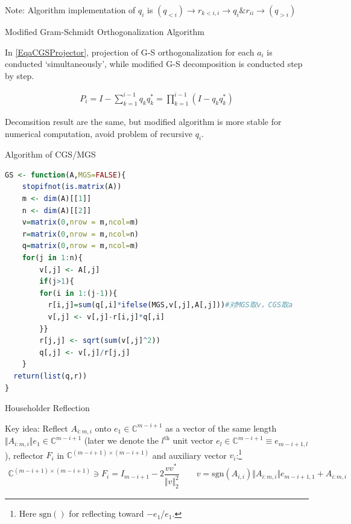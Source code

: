     Note: Algorithm implementation of $ q_i $ is $ (q_{<i})\to r_{k<i,i}\to q_{i}\& r_{ii} \to (q_{>i}) $


\begin{point}
    Modified Gram-Schmidt Orthogonalization Algorithm
\end{point}

    In \autoref{EqaCGSProjector}, projection of G-S orthogonalization for each $ a_i $ is conducted `simultaneously', while modified G-S decomposition is conducted step by step.

\begin{align}
    P_i=I-\sum_{k=1}^{i-1}q_kq_k^*=\prod_{k=1}^{i-1}(I-q_kq_k^*) 
\end{align}
    
    Decomsition result are the same, but modified algorithm is more stable for numerical computation, avoid problem of recursive $ q_i $.


\begin{rcode}
    Algorithm of CGS/MGS
\begin{lstlisting}[language=R]
GS <- function(A,MGS=FALSE){
    stopifnot(is.matrix(A))
    m <- dim(A)[[1]]
    n <- dim(A)[[2]]
    v=matrix(0,nrow = m,ncol=m)
    r=matrix(0,nrow = m,ncol=n)
    q=matrix(0,nrow = m,ncol=m)
    for(j in 1:n){
        v[,j] <- A[,j]
        if(j>1){
        for(i in 1:(j-1)){
          r[i,j]=sum(q[,i]*ifelse(MGS,v[,j],A[,j]))#对MGS取v，CGS取a
          v[,j] <- v[,j]-r[i,j]*q[,i]
        }}
        r[j,j] <- sqrt(sum(v[,j]^2))
        q[,j] <- v[,j]/r[j,j]
    }
  return(list(q,r))
}
\end{lstlisting}
\end{rcode}






\begin{point}
    \hypertarget{Householder-Reflection}{Householder Reflection}
\end{point}

    Key idea: Reflect $ A_{i:m,i} $ onto $ e_{1}\in\mathbb{C}^{m-i+1} $ as a vector of the same length $ \Vert  A_{i:m,i} \Vert e_{1}\in\mathbb{C}^{m-i+1} $ (later we denote the $ l^\mathrm{th}  $ unit vector $ e_{l}\in\mathbb{C}^{m-i+1}\equiv e_{m-i+1,l} $), reflector $ F_i $ in $ \mathbb{C}^{(m-i+1)\times (m-i+1)} $ and auxiliary vector $ v_i $:\footnote{Here $ \mathrm{sgn}() $ for reflecting toward $ -e_1 $/$ e_1 $.}
    \begin{align}
        \mathbb{C}^{(m-i+1)\times( m-i+1)} \ni F_i=I_{m-i+1}-2\dfrac{vv^*\,}{\Vert v \Vert_2^2 }\qquad v= \mathrm{sgn}(A_{i,i}) \Vert  A_{i:m,i} \Vert e_{m-i+1,1}+ A_{i:m,i} 
    \end{align}

